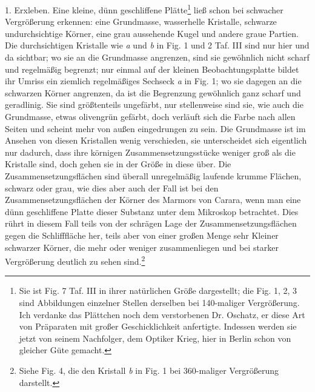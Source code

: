 \documentclass[a4paper, 11pt, oneside]{article}
\begin{document}
1. Erxleben. Eine kleine, dünn geschliffene Plätte\footnote{Sie ist Fig. 7 Taf. III in ihrer natürlichen Größe dargestellt; die Fig. 1, 2, 3 sind Abbildungen einzelner Stellen derselben bei 140-maliger Vergrößerung. Ich verdanke das Plättchen noch dem verstorbenen Dr. Oschatz, er diese Art von Präparaten mit großer Geschicklichkeit anfertigte. Indessen werden sie jetzt von seinem Nachfolger, dem Optiker Krieg, hier in Berlin schon von gleicher Güte gemacht.} ließ schon bei schwacher Vergrößerung erkennen: eine Grundmasse, wasserhelle Kristalle, schwarze undurchsichtige Körner, eine grau aussehende Kugel und andere graue Partien. Die durchsichtigen Kristalle wie \emph{a} und \emph{b} in Fig. 1 und 2 Taf. III sind nur hier und da sichtbar; wo sie an die Grundmasse angrenzen, sind sie gewöhnlich nicht scharf und regelmäßig begrenzt; nur einmal auf der kleinen Beobachtungsplatte bildet ihr Umriss ein ziemlich regelmäßiges Sechseck \emph{a} in Fig. 1; wo sie dagegen an die schwarzen Körner angrenzen, da ist die Begrenzung gewöhnlich ganz scharf und geradlinig. Sie sind größtenteils ungefärbt, nur stellenweise sind sie, wie auch die Grundmasse, etwas olivengrün gefärbt, doch verläuft sich die Farbe nach allen Seiten und scheint mehr von außen eingedrungen zu sein. Die Grundmasse ist im Ansehen von diesen Kristallen wenig verschieden, sie unterscheidet sich eigentlich nur dadurch, dass ihre körnigen Zusammensetzungsstücke weniger groß als die Kristalle sind, doch gehen sie in der Größe in diese über. Die Zusammensetzungsflächen sind überall unregelmäßig laufende krumme Flächen, schwarz oder grau, wie dies aber auch der Fall ist bei den Zusammensetzungsflächen der Körner des Marmors von Carara, wenn man eine dünn geschliffene Platte dieser Substanz unter dem Mikroskop betrachtet. Dies rührt in diesem Fall teils von der schrägen Lage der Zusammensetzungsflächen gegen die Schlifffläche her, teils aber von einer großen Menge sehr Kleiner schwarzer Körner, die mehr oder weniger zusammenliegen und bei starker Vergrößerung deutlich zu sehen sind.\footnote{Siehe Fig. 4, die den Kristall \emph{b} in Fig. 1 bei 360-maliger Vergrößerung darstellt.}
\end{document}
